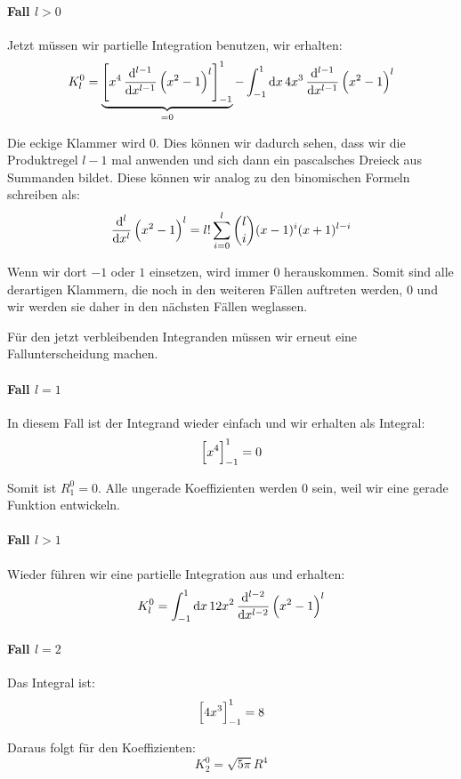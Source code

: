 \paragraph{Fall $l > 0$}

Jetzt müssen wir partielle Integration benutzen, wir erhalten:
\[
K_l^0 = \underbrace{\sbr{x^4 \dod[l-1]{}x \del{x^2-1}^l}_{-1}^1}_{=0} - \int_{-1}^1 \dif x \, 4 x^3 \dod[l-1]{}x \del{x^2-1}^l
\]

Die eckige Klammer wird $0$. Dies können wir dadurch sehen, dass wir die
Produktregel $l-1$ mal anwenden und sich dann ein pascalsches Dreieck aus
Summanden bildet. Diese können wir analog zu den binomischen Formeln schreiben
als:
\begin{equation}
	\label{eq:leibniz}
	\dod[l]{}x \del{x^2-1}^l = l! \sum_{i=0}^l \binom{l}{i} (x-1)^i (x+1)^{l-i}
\end{equation}

Wenn wir dort $-1$ oder $1$ einsetzen, wird immer $0$ herauskommen. Somit sind
alle derartigen Klammern, die noch in den weiteren Fällen auftreten werden, 0
und wir werden sie daher in den nächsten Fällen weglassen.

Für den jetzt verbleibenden Integranden müssen wir erneut eine
Fallunterscheidung machen.

\paragraph{Fall $l = 1$}

In diesem Fall ist der Integrand wieder einfach und wir erhalten als Integral:
\[
\sbr{x^4}_{-1}^1 = 0
\]

Somit ist $R_1^0 = 0$. Alle ungerade Koeffizienten werden 0 sein, weil wir eine
gerade Funktion entwickeln.

\paragraph{Fall $l > 1$}

Wieder führen wir eine partielle Integration aus und erhalten:
\[
K_l^0 = \int_{-1}^1 \dif x \, 12 x^2 \dod[l-2]{}x \del{x^2-1}^l
\]

\paragraph{Fall $l = 2$}

Das Integral ist:
\[
\sbr{4x^3}_{-1}^1 = 8
\]

Daraus folgt für den Koeffizienten:
\[
K_2^0 = \sqrt{5 \pi} R^4
\]

